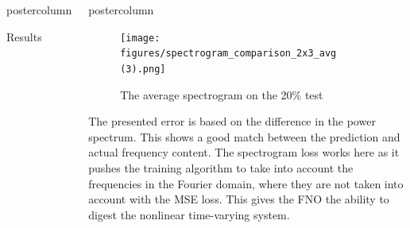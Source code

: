 \documentclass[mathserif]{beamer}
\newlength{\columnheight}
\begin{document}
\begin{frame}
\begin{columns}
\begin{beamercolorbox}[center,wd=\textwidth]{postercolumn}
\begin{minipage}[T]{.95\linewidth}
{\begin{block}{Results}

\end{block}		






    }
\end{minipage}
\end{beamercolorbox}




		\begin{beamercolorbox}[center,wd=\textwidth]{postercolumn}
			\begin{minipage}[T]{.95\linewidth}  %
			     \parbox[t][\columnheight]{\textwidth}{ %
\begin{figure}
    \centering
    \texttt{[image: figures/spectrogram\_comparison\_2x3\_avg (3).png]}
    \caption{The average spectrogram on the 20\% test}
    \label{fig:enter-label}
\end{figure}

The presented error is based on the difference in the power spectrum. This shows a good match between the prediction and actual frequency content. The spectrogram loss works here as it pushes the training algorithm to take into account the frequencies in the Fourier domain, where they are not taken into account with the MSE loss. This gives the FNO the ability to digest the nonlinear time-varying system.\\



}
\end{minipage}
\end{beamercolorbox}
\end{columns}
\end{frame}
\end{document}
